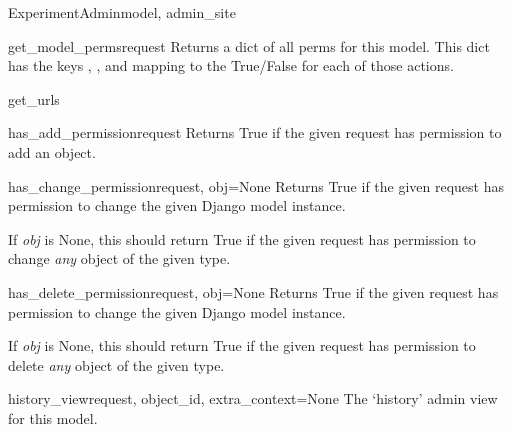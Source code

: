 \documentclass[letterpaper,10pt,english]{sphinxmanual}
\begin{document}
\begin{classdesc}{ExperimentAdmin}{model, admin\_site}
\hypertarget{data.admin.ExperimentAdmin.get_model_perms}{}\begin{methoddesc}{get\_model\_perms}{request}
Returns a dict of all perms for this model. This dict has the keys
, , and  mapping to the True/False for each
of those actions.
\end{methoddesc}

\hypertarget{data.admin.ExperimentAdmin.get_urls}{}\begin{methoddesc}{get\_urls}{}\end{methoddesc}

\hypertarget{data.admin.ExperimentAdmin.has_add_permission}{}\begin{methoddesc}{has\_add\_permission}{request}
Returns True if the given request has permission to add an object.
\end{methoddesc}

\hypertarget{data.admin.ExperimentAdmin.has_change_permission}{}\begin{methoddesc}{has\_change\_permission}{request, obj=None}
Returns True if the given request has permission to change the given
Django model instance.

If \emph{obj} is None, this should return True if the given request has
permission to change \emph{any} object of the given type.
\end{methoddesc}

\hypertarget{data.admin.ExperimentAdmin.has_delete_permission}{}\begin{methoddesc}{has\_delete\_permission}{request, obj=None}
Returns True if the given request has permission to change the given
Django model instance.

If \emph{obj} is None, this should return True if the given request has
permission to delete \emph{any} object of the given type.
\end{methoddesc}

\hypertarget{data.admin.ExperimentAdmin.history_view}{}\begin{methoddesc}{history\_view}{request, object\_id, extra\_context=None}
The `history' admin view for this model.
\end{methoddesc}


\end{classdesc}
\end{document}
